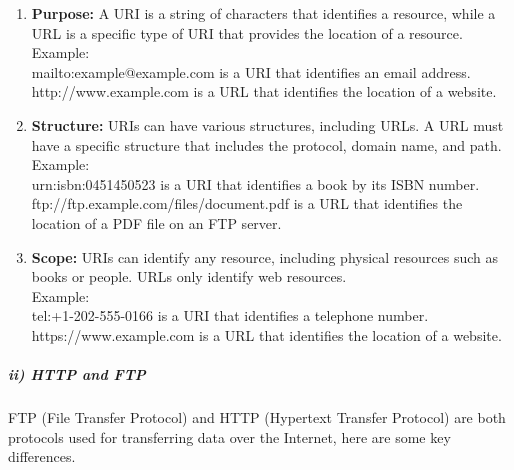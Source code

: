 \documentclass[11pt]{article}
\begin{document}
\begin{enumerate}
    \item \textbf{Purpose:} A URI is a string of characters that identifies a resource, while a URL is a specific type of URI that provides the location of a resource.\\
        Example:\\
        mailto:example@example.com is a URI that identifies an email address.\\
        http://www.example.com is a URL that identifies the location of a website.\\
    \item \textbf{Structure:} URIs can have various structures, including URLs. A URL must have a specific structure that includes the protocol, domain name, and path.\\
        Example:\\
        urn:isbn:0451450523 is a URI that identifies a book by its ISBN number.\\
        ftp://ftp.example.com/files/document.pdf is a URL that identifies the location of a PDF file on an FTP server.\\
    \item \textbf{Scope:} URIs can identify any resource, including physical resources such as books or people. URLs only identify web resources.\\
        Example:\\
        tel:+1-202-555-0166 is a URI that identifies a telephone number.\\
        https://www.example.com is a URL that identifies the location of a website.\\
\end{enumerate}

\subparagraph{ii) HTTP and FTP\\}
FTP (File Transfer Protocol) and HTTP (Hypertext Transfer Protocol) are both protocols used for transferring data over the Internet, here are some key differences.
\end{document}
